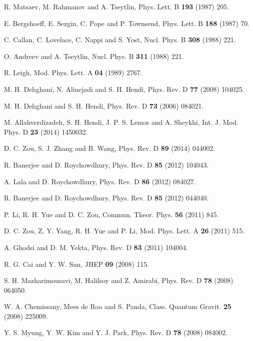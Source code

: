 \documentclass[aps,onecolumn ]{revtex4}
\begin{document}
\begin{thebibliography}{99}
 R. Matsaev, M. Rahmanov and A. Tseytlin, Phys. Lett. B
\textbf{193} (1987) 205.

 E. Bergshoeff, E. Sezgin, C. Pope and P. Townsend, Phys. Lett. B
\textbf{188} (1987) 70.

 C. Callan, C. Lovelace, C. Nappi and S. Yost, Nucl. Phys. B
\textbf{308} (1988) 221.

 O. Andreev and A. Tseytlin, Nucl. Phys. B \textbf{311} (1988)
221.

 R. Leigh, Mod. Phys. Lett. A \textbf{04} (1989) 2767.

 M. H. Dehghani, N. Alinejadi and S. H. Hendi, Phys.
Rev. D \textbf{77} (2008) 104025.

 M. H. Dehghani and S. H. Hendi, Phys. Rev. D \textbf{73} (2006)
084021.

 M. Allahverdizadeh, S. H. Hendi, J. P. S. Lemos and A. Sheykhi,
Int. J. Mod. Phys. D \textbf{23} (2014) 1450032.

 D. C. Zou, S. J. Zhang and B. Wang, Phys. Rev. D \textbf{89}
(2014) 044002.

 R. Banerjee and D. Roychowdhury, Phys. Rev. D \textbf{85} (2012)
104043.

 A. Lala and D. Roychowdhury, Phys. Rev. D \textbf{86} (2012)
084027.

 R. Banerjee and D. Roychowdhury, Phys. Rev. D \textbf{85} (2012)
044040.

 P. Li, R. H. Yue and D. C. Zou, Commun. Theor. Phys. \textbf{56}
(2011) 845.

 D. C. Zou, Z. Y. Yang, R. H. Yue and P. Li, Mod. Phys. Lett. A \textbf{26}
(2011) 515.

 A. Ghodsi and D. M. Yekta, Phys. Rev. D \textbf{83} (2011)
104004.

 R. G. Cai and Y. W. Sun, JHEP \textbf{09} (2008)
115.

 S. H. Mazharimousavi, M. Halilsoy and Z. Amirabi, Phys. Rev. D \textbf{78}
(2008) 064050.

 W. A. Chemissany, Mees de Roo and S. Panda, Class. Quantum Gravit.
\textbf{25} (2008) 225009.

 Y. S. Myung, Y. W. Kim and Y. J. Park, Phys. Rev. D \textbf{78} (2008)
084002.


\end{thebibliography}
\end{document}
